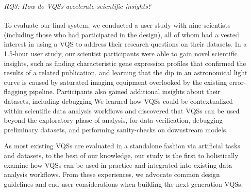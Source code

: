 \emph{RQ3: How do VQSs accelerate scientific insights?}\\
\\ To evaluate our final system, we conducted a user study with nine scientists (including those who had participated in the design), all of whom had a vested interest in using a VQS to address their research questions on their datasets. In a 1.5-hour user study, our scientist participants were able to gain novel scientific insights, such as  finding characteristic gene expression profiles that confirmed the results of a related publication, and learning that the dip in an astronomical light curve is caused by saturated imaging equipment overlooked by the existing error-flagging pipeline. 
Participants also gained additional insights about their datasets, including debugging 
We learned how VQSs could be contextualized within scientific data analysis workflows and discovered that VQSs can be used beyond the exploratory phase of analysis, for data verification, debugging preliminary datasets, and performing sanity-checks on downstream models.
\par As most existing VQSs are evaluated in a standalone fashion via artificial tasks and datasets, to the best of our knowledge, our study is the first to holistically examine how VQSs can be used in practice and integrated into existing data analysis workflows. From these experiences, we advocate common design guidelines and end-user considerations when building the next generation VQSs.
